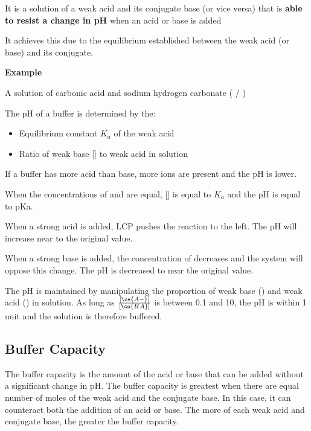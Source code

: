 		It is a solution of a weak acid and its conjugate base (or vice versa) that is \textbf{able to resist a change in pH} when an acid or base is added

		It achieves this due to the equilibrium established between the weak acid (or base) and its conjugate.

		\textbf{Example}
		
		A solution of carbonic acid and sodium hydrogen carbonate ( / )

		The pH of a buffer is determined by the:

		\begin{itemize}
			\item Equilibrium constant $K_a$ of the weak acid
			\item Ratio of weak base [] to weak acid {} in solution
		\end{itemize}

		If a buffer has more acid than base, more  ions are present and the pH is lower.

		When the concentrations of  and  are equal, [] is equal to $K_a$ and the pH is equal to pKa.

		\begin{center}
		\end{center}

		When a strong acid is added, LCP pushes the reaction to the left. The pH will increase near to the original value.

		When a strong base is added, the concentration of  decreases and the system will oppose this change. The pH is decreased to near the original value.

		The pH is maintained by manipulating the proportion of weak base () and weak acid () in solution. As long as $\frac{[\ce{A-}]}{[\ce{HA}]}$ is between 0.1 and 10, the pH is within 1 unit and the solution is therefore buffered.

	\subsection{Buffer Capacity}
	
		The buffer capacity is the amount of the acid or base that can be added without a significant change in pH. The buffer capacity is greatest when there are equal number of moles of the weak acid and the conjugate base. In this case, it can counteract both the addition of an acid or base. The more of each weak acid and conjugate base, the greater the buffer capacity.

